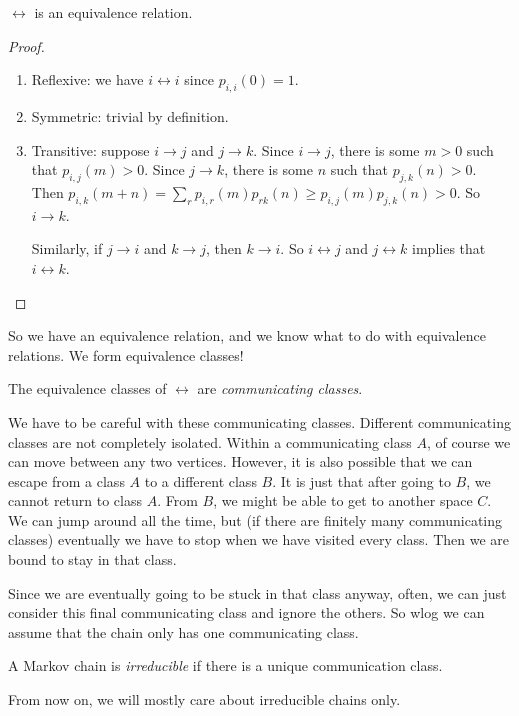 \documentclass[a4paper]{article}
\begin{document}
\begin{prop}
  $\leftrightarrow$ is an equivalence relation.
\end{prop}

\begin{proof}\leavevmode
  \begin{enumerate}
    \item Reflexive: we have $i \leftrightarrow i$ since $p_{i, i}(0) = 1$.
    \item Symmetric: trivial by definition.
    \item Transitive: suppose $i \to j$ and $j \to k$. Since $i \to j$, there is some $m > 0$ such that $p_{i, j}(m) > 0$. Since $j \to k$, there is some $n$ such that $p_{j, k}(n) > 0$. Then $p_{i, k}(m + n) = \sum_{r} p_{i, r}(m)p_{r k}(n) \geq p_{i, j}(m)p_{j, k}(n) > 0$. So $i \to k$.

      Similarly, if $j \to i$ and $k \to j$, then $k \to i$. So $i \leftrightarrow j$ and $j \leftrightarrow k$ implies that $i \leftrightarrow k$.
  \end{enumerate}
\end{proof}
So we have an equivalence relation, and we know what to do with equivalence relations. We form equivalence classes!
\begin{defi}
  The equivalence classes of $\leftrightarrow$ are \emph{communicating classes}.
\end{defi}
We have to be careful with these communicating classes. Different communicating classes are not completely isolated. Within a communicating class $A$, of course we can move between any two vertices. However, it is also possible that we can escape from a class $A$ to a different class $B$. It is just that after going to $B$, we cannot return to class $A$. From $B$, we might be able to get to another space $C$. We can jump around all the time, but (if there are finitely many communicating classes) eventually we have to stop when we have visited every class. Then we are bound to stay in that class.

Since we are eventually going to be stuck in that class anyway, often, we can just consider this final communicating class and ignore the others. So wlog we can assume that the chain only has one communicating class.

\begin{defi}
  A Markov chain is \emph{irreducible} if there is a unique communication class.
\end{defi}
From now on, we will mostly care about irreducible chains only.
\end{document}
